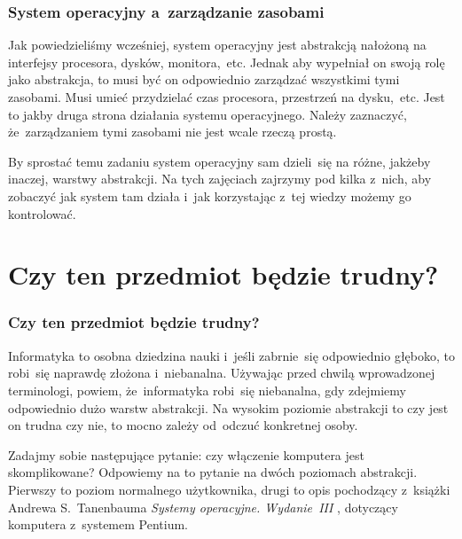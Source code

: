 \documentclass[10pt,t]{beamer}
\begin{document}





\begin{frame}
  \frametitle{System operacyjny a~zarządzanie zasobami}


  Jak powiedzieliśmy wcześniej, system operacyjny jest abstrakcją nałożoną
  na interfejsy procesora, dysków, monitora,~etc. Jednak aby wypełniał
  on swoją rolę jako abstrakcja, to musi być on odpowiednio
  \alert{zarządzać} wszystkimi tymi zasobami. Musi umieć przydzielać czas
  procesora, przestrzeń na dysku,~etc. Jest to jakby druga strona działania
  systemu operacyjnego. Należy zaznaczyć, że~zarządzaniem tymi zasobami nie
  jest wcale rzeczą prostą.

  By sprostać temu zadaniu system operacyjny sam dzieli~się na różne,
  jakżeby inaczej, warstwy abstrakcji. Na tych zajęciach zajrzymy pod kilka
  z~nich, aby zobaczyć jak system tam działa i~jak korzystając z~tej wiedzy
  możemy go kontrolować.

\end{frame}










\section{Czy ten przedmiot będzie trudny?}



\begin{frame}
  \frametitle{Czy ten przedmiot będzie trudny?}


  Informatyka to osobna dziedzina nauki i~jeśli zabrnie~się odpowiednio
  głęboko, to robi~się naprawdę złożona i~niebanalna. Używając przed chwilą
  wprowadzonej terminologi, powiem, że~informatyka robi~się niebanalna, gdy
  zdejmiemy odpowiednio dużo warstw abstrakcji. Na wysokim poziomie
  abstrakcji to czy jest on trudna czy nie, to mocno zależy od~odczuć
  konkretnej osoby.

  Zadajmy sobie następujące pytanie: czy włączenie komputera jest
  skomplikowane? Odpowiemy na to pytanie na dwóch poziomach abstrakcji.
  Pierwszy to poziom normalnego użytkownika, drugi to opis pochodzący
  z~książki Andrewa S.~Tanenbauma \textit{Systemy operacyjne. Wydanie~III}
  \parencite{Tannenbaum-Systemy-Operacyjne-Wydanie-III-Pub-2013}, dotyczący
  komputera z~systemem Pentium.

\end{frame}
\end{document}
